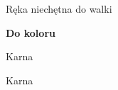 \documentclass[12pt, a4paper]{article}
\begin{document}
\compsequence{{2\diams}{2\major}}
\begin{compoptions}[3]
    \item[\pass] Ręka niechętna do walki
    \item[\dbl] \textbf{Do koloru}
\end{compoptions}
    
\compsequence{{2\diams}{2\ntx}}
\begin{compoptions}[3]
    \item[\dbl] Karna
\end{compoptions}

\compsequence{{2\diams}{3\minor}}
\begin{compoptions}[3]
    \item[\dbl] Karna
\end{compoptions}
\end{document}
